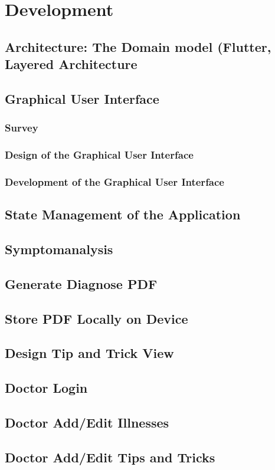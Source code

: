 

\chapter{Development}

\section{Architecture: The Domain model (Flutter, Layered Architecture}
\section{Graphical User Interface}
\subsection{Survey}
\subsection{Design of the Graphical User Interface}
\subsection{Development of the Graphical User Interface}
\section{State Management of the Application}
\section{Symptomanalysis}
\section{Generate Diagnose PDF}
\section{Store PDF Locally on Device}
\section{Design Tip and Trick View}
\section{Doctor Login}
\section{Doctor Add/Edit Illnesses}
\section{Doctor Add/Edit Tips and Tricks}

